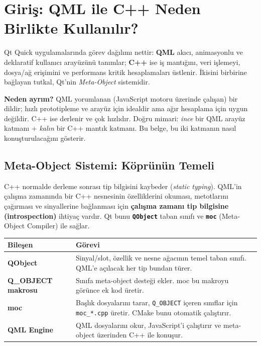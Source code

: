 \documentclass[11pt,a4paper]{article}
\newcommand{\kls}[1]{\texttt{\color{anaMavi}\textbf{#1}}}
\newcommand{\kod}[1]{\texttt{\color{koyuGri}#1}}
\begin{document}
\section{Giriş: QML ile C++ Neden Birlikte Kullanılır?}

Qt Quick uygulamalarında görev dağılımı nettir: \textbf{QML} akıcı, animasyonlu
ve deklaratif kullanıcı arayüzünü tanımlar; \textbf{C++} ise iş mantığını, veri
işlemeyi, dosya/ağ erişimini ve performans kritik hesaplamaları üstlenir. İkisini
birbirine bağlayan tutkal, Qt'nin \emph{Meta-Object} sistemidir.

\begin{bilgikutu}
\textbf{Neden ayrım?} QML yorumlanan (JavaScript motoru üzerinde çalışan) bir
dildir; hızlı prototipleme ve arayüz için idealdir ama ağır hesaplama için
uygun değildir. C++ ise derlenir ve çok hızlıdır. Doğru mimari: \emph{ince}
bir QML arayüz katmanı + \emph{kalın} bir C++ mantık katmanı. Bu belge, bu iki
katmanın nasıl konuşturulacağını gösterir.
\end{bilgikutu}

\subsection{Meta-Object Sistemi: Köprünün Temeli}

C++ normalde derleme sonrası tip bilgisini kaybeder (\emph{static typing}). QML'in
çalışma zamanında bir C++ nesnesinin özelliklerini okuması, metotlarını çağırması
ve sinyallerine bağlanması için \textbf{çalışma zamanı tip bilgisine (introspection)}
ihtiyaç vardır. Qt bunu \kls{QObject} taban sınıfı ve \kls{moc} (Meta-Object
Compiler) ile sağlar.

\begin{center}
\begin{tabularx}{\textwidth}{@{}>{\bfseries\color{anaMavi}}l >{\raggedright\arraybackslash}X@{}}
\toprule
\rowcolor{acikMavi} \color{anaMavi}\textbf{Bileşen} & \color{anaMavi}\textbf{Görevi} \\
\midrule
QObject & Sinyal/slot, özellik ve nesne ağacının temel taban sınıfı. QML'e açılacak her tip bundan türer. \\
\rowcolor{acikGri} Q\_OBJECT makrosu & Sınıfa meta-object desteği ekler. moc bu makroyu görünce ek kod üretir. \\
moc & Başlık dosyalarını tarar, \kod{Q\_OBJECT} içeren sınıflar için \kod{moc\_*.cpp} üretir. CMake bunu otomatik çalıştırır. \\
\rowcolor{acikGri} QML Engine & QML dosyalarını okur, JavaScript'i çalıştırır ve meta-object üzerinden C++ ile konuşur. \\
\bottomrule
\end{tabularx}
\end{center}
\end{document}
